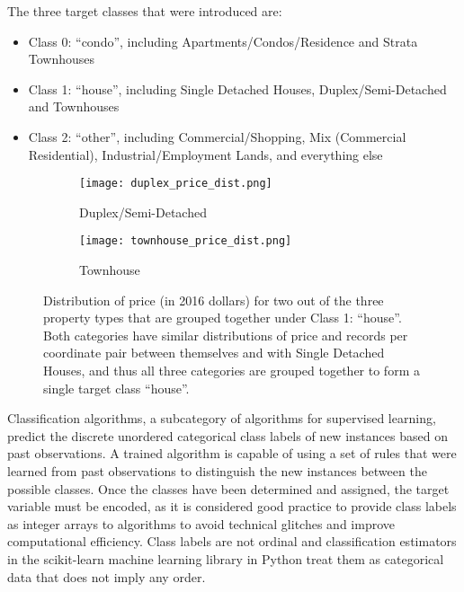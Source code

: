 \vspace{5mm}

The three target classes that were introduced are:

\begin{itemize}
    \item Class 0: ``condo'', including Apartments/Condos/Residence and Strata Townhouses
    \item Class 1: ``house'', including Single Detached Houses, Duplex/Semi-Detached and Townhouses
    \item Class 2: ``other'', including Commercial/Shopping, Mix (Commercial Residential), Industrial/Employment Lands, and everything else
\end{itemize}

\begin{figure}[ht]
    \centering
    \begin{subfigure}{\linewidth}
        \centering
        \texttt{[image: duplex\_price\_dist.png]}
        \label{fig:duplex_price_dist}
        \caption{Duplex/Semi-Detached}
    \end{subfigure}

    \begin{subfigure}{\linewidth}
        \centering
        \texttt{[image: townhouse\_price\_dist.png]}
        \label{fig:townhouse_price_dist}
        \caption{Townhouse}
    \end{subfigure}
    \caption{Distribution of price (in 2016 dollars) for two out of the three property types that are grouped together under Class 1: ``house''.
    Both categories have similar distributions of price and records per coordinate pair between themselves and with Single Detached Houses, and thus all three categories are grouped together to form a single target class ``house''.}
    \label{fig:class_2_price_dist}
\end{figure}

Classification algorithms, a subcategory of algorithms for supervised learning, predict the discrete unordered categorical class labels of new instances based on past observations.
A trained algorithm is capable of using a set of rules that were learned from past observations to distinguish the new instances between the possible classes.
Once the classes have been determined and assigned, the target variable must be encoded, as it is considered good practice to provide class labels as integer arrays to algorithms to avoid technical glitches and improve computational efficiency.
Class labels are not ordinal and classification estimators in the scikit-learn\cite{scikit-learn} machine learning library in Python treat them as categorical data that does not imply any order.

